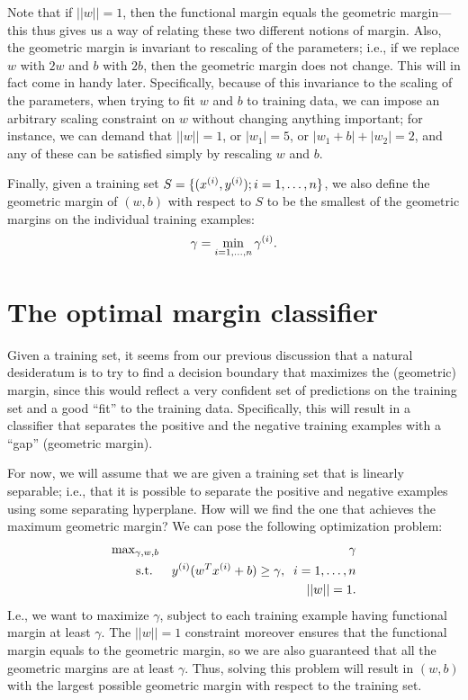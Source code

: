 \documentclass{article}
\begin{document}
Note that if $||w||=1$, then the functional margin equals the geometric margin---this thus gives
us a way of relating these two different notions of margin.  Also, the geometric margin
is invariant to rescaling of the parameters; i.e., if we replace $w$ with $2w$ and $b$ with $2b$, then
the geometric margin does not change.
This will in fact come in handy later.  Specifically, because of this invariance to the scaling of the parameters,
when trying to fit $w$ and $b$ to training data, we can impose an arbitrary scaling constraint on $w$ without
changing anything important; for instance, we can demand that $||w||=1$, or $|w_1| = 5$,
or $|w_1 + b| + |w_2| = 2$, and any of these can be satisfied simply by rescaling $w$ and $b$.

Finally, given a training set $S = \{({x^{(i)}},{y^{(i)}}); i=1,\ldots,{n}\}$, we also define
the geometric margin of $(w,b)$ with respect to $S$ to be the smallest of the geometric margins on the
individual training examples:
\[
\gamma =\min_{i=1,\ldots,{n}} \gamma^{(i)}.
\]

\section{The optimal margin classifier}

Given a training set, it seems from our previous discussion that a natural desideratum
is to try to find a decision boundary that maximizes the (geometric) margin, since this
would reflect a very confident set of predictions on the training set and a good ``fit'' to
the training data.  Specifically, this will result in a classifier that separates the positive
and the negative training examples with a ``gap'' (geometric margin).

For now, we will assume that we are given a training set that is linearly separable; i.e., that
it is possible to separate the positive and negative examples using some separating hyperplane.
How will we find the one that achieves the maximum geometric margin?  We can pose the following optimization
problem:
\begin{eqnarray*}
&\hbox{max}_{\gamma,w,b}& \gamma \\
&\;\;\;\;\;\;\;\hbox{s.t.}& {y^{(i)}} (w^T{x^{(i)}} + b) \geq \gamma,\;\; i=1, \ldots, {n} \\
&& ||w|| = 1.
\end{eqnarray*}
I.e., we want to maximize $\gamma$, subject to each training example having functional margin at least $\gamma$.
The $||w||=1$ constraint moreover ensures that the functional margin equals to the geometric margin, so
we are also guaranteed that all the geometric margins are at least $\gamma$.
Thus, solving this problem will result in $(w,b)$ with the largest possible geometric margin
with respect to the training set.
\end{document}
